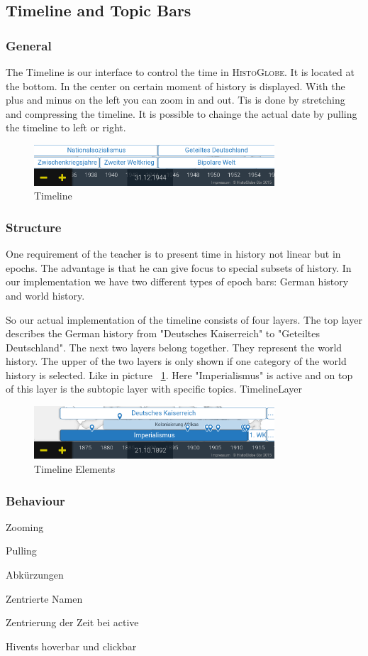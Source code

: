 \subsection{Timeline and Topic Bars}

\subsubsection{General}
The Timeline is our interface to control the time in \textsc{HistoGlobe}. It is located at the bottom. In the center on certain moment of history is displayed. With the plus and minus on the left you can zoom in and out. Tis is done by stretching and compressing the timeline. It is possible to chainge the actual date by pulling the timeline to left or right.

\begin{figure}[H]
	\centering
	\includegraphics[width=0.8\textwidth]{graphics/timeline_now.png}
	\caption{Timeline}
\end{figure}

\subsubsection{Structure}
One requirement of the teacher is to present time in history not linear but in epochs. The advantage is that he can give focus to special subsets of history. In our implementation we have two different types of epoch bars: German history and world history.

So our actual implementation of the timeline consists of four layers. The top layer describes the German history from "Deutsches Kaiserreich" to "Geteiltes Deutschland". The next two layers belong together. They represent the world history. The upper of the two layers is only shown if one category of the world history is selected. Like in picture ~\ref{fig:Timeline_Elements}. Here "Imperialismus" is active and on top of this layer is the subtopic layer with specific topics. TimelineLayer

\begin{figure}[H]
	\centering
	\includegraphics[width=0.8\textwidth]{graphics/timeline_elements.png}
	\caption{Timeline Elements}
	\label{fig:Timeline_Elements}
\end{figure}



\subsubsection{Behaviour}
Zooming 

Pulling 

Abkürzungen

Zentrierte Namen

Zentrierung der Zeit bei active

Hivents hoverbar und clickbar